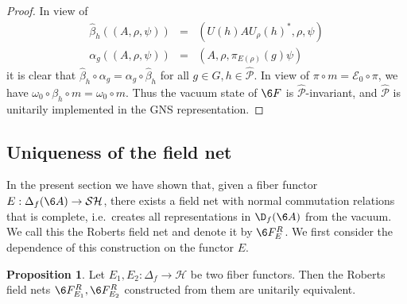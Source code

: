 \documentclass[11pt]{article}
\theoremstyle{definition}
\newtheorem{prop}[thm]{Proposition}
\theoremstyle{definition}
\theoremstyle{remark}
\def\2#1{{\mathcal #1}}
\newcommand{\rarr}{\rightarrow}
\begin{document}
\begin{proof}
In view of 
\begin{eqnarray*} \widehat{\beta}_h((A,\rho,\psi))  &=&  (U(h)AU_\rho(h)^*,\rho,\psi) \\
    \alpha_g((A,\rho,\psi)) &=& (A,\rho,\pi_{E(\rho)}(g)\psi) \end{eqnarray*}
it is clear that $\widehat{\beta}_h\circ\alpha_g=\alpha_g\circ\widehat{\beta}_h$ for all 
$g\in G, h\in\widehat{\2P}$. In view of $\pi\circ m=\2E_0\circ\pi$, we have
$\omega_0\circ\beta_h\circ m=\omega_0\circ m$. 
Thus the vacuum state of $\6F$ is $\widehat{\2P}$-invariant, and $\widehat{\2P}$ is unitarily
implemented in the GNS representation. 
\end{proof}



\subsection{Uniqueness of the field net}
In the present section we have shown that, given a fiber functor $E:\Delta_f(\6A)\rarr\2S\2H$, there
exists a field net with normal commutation relations that is complete, i.e.\ creates all
representations in $\D_f(\6A)$ from the vacuum. We call this the Roberts field net and denote it by
$\6F^R_E$. We first consider the dependence of this construction on the functor $E$.

\begin{prop}
Let $E_1,E_2:\Delta_f\rarr\2H$ be two fiber functors. Then the Roberts field nets
$\6F^R_{E_1},\6F^R_{E_2}$ constructed from them are unitarily equivalent.
\end{prop}
\end{document}
